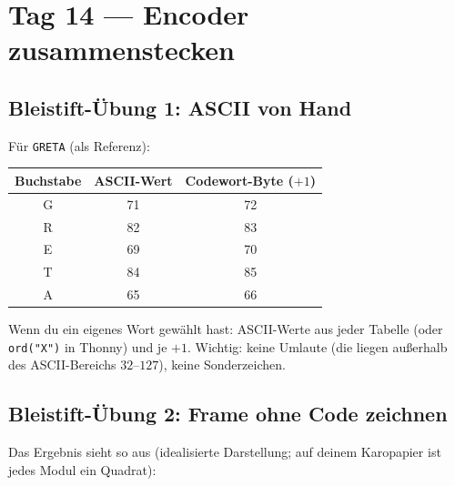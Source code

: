 \section*{Tag 14 — Encoder zusammenstecken}

\subsection*{Bleistift-Übung 1: ASCII von Hand}

Für \texttt{GRETA} (als Referenz):

\begin{center}
\begin{tabular}{c | c | c}
\toprule
Buchstabe & ASCII-Wert & Codewort-Byte ($+1$) \\
\midrule
G & 71 & 72 \\
R & 82 & 83 \\
E & 69 & 70 \\
T & 84 & 85 \\
A & 65 & 66 \\
\bottomrule
\end{tabular}
\end{center}

Wenn du ein eigenes Wort gewählt hast: ASCII-Werte aus jeder
Tabelle (oder \texttt{ord("X")} in Thonny) und je $+1$. Wichtig:
keine Umlaute (die liegen außerhalb des ASCII-Bereichs $32$--$127$),
keine Sonderzeichen.

\subsection*{Bleistift-Übung 2: Frame ohne Code zeichnen}

Das Ergebnis sieht so aus (idealisierte Darstellung; auf deinem
Karopapier ist jedes Modul ein Quadrat):

\begin{center}
\end{center}

